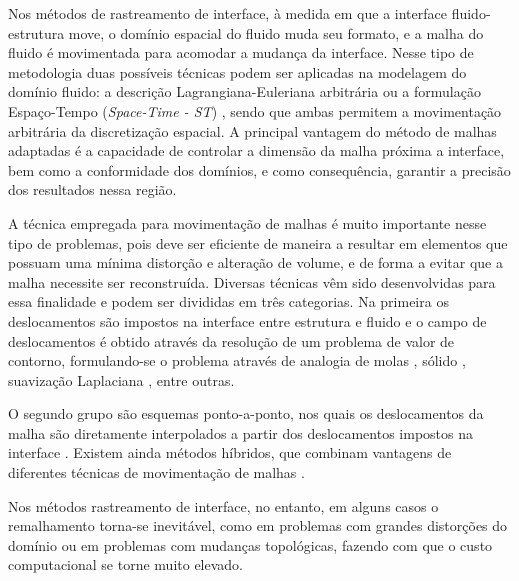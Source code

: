 \documentclass[tese_patricia.tex]{subfiles}
\begin{document}
Nos métodos de rastreamento de interface, à medida em que a interface fluido-estrutura move, o domínio espacial do fluido muda seu formato, e a malha do fluido é movimentada para acomodar a mudança da interface. Nesse tipo de metodologia duas possíveis técnicas podem ser aplicadas na modelagem do domínio fluido: a descrição Lagrangiana-Euleriana arbitrária \cite{HughesLZ:1981,DoneaGH:1982,KanchiM:2007} ou a formulação Espaço-Tempo (\textit{Space-Time - ST}) \cite{TezduyarBL:1992b,TezduyarBML:1992c,TakizawaT:2012}, sendo que ambas permitem a movimentação arbitrária da discretização espacial. A principal vantagem do método de malhas adaptadas é a capacidade de controlar a dimensão da malha próxima a interface, bem como a conformidade dos domínios, e como consequência, garantir a precisão dos resultados nessa região.

A técnica empregada para movimentação de malhas é muito importante nesse tipo de problemas, pois deve ser eficiente de maneira a resultar em elementos que possuam uma mínima distorção e alteração de volume, e de forma a evitar que a malha necessite ser reconstruída. Diversas técnicas vêm sido desenvolvidas para essa finalidade e podem ser divididas em três categorias. Na primeira os deslocamentos são impostos na interface entre estrutura e fluido e o campo de deslocamentos é obtido através da resolução de um problema de valor de contorno, formulando-se o problema através de analogia de molas \cite{BottassoDS:2005}, sólido \cite{JohnsonT:1994,SteinTB:2004}, suavização Laplaciana \cite{KanchiM:2007}, entre outras.

O segundo grupo são esquemas ponto-a-ponto, nos quais os deslocamentos da malha são diretamente interpolados a partir dos deslocamentos impostos na interface \cite{DoneaGH:1982,TezduyarABJ:1993,SanchesC:2014}. Existem ainda métodos híbridos, que combinam vantagens de diferentes técnicas de movimentação de malhas \cite{Lefrancois:2008,FernandesCS:2019}. 

Nos métodos rastreamento de interface, no entanto, em alguns casos o remalhamento torna-se inevitável, como em problemas com grandes distorções do domínio ou em problemas com mudanças topológicas, fazendo com que o custo computacional se torne muito elevado.
\end{document}
